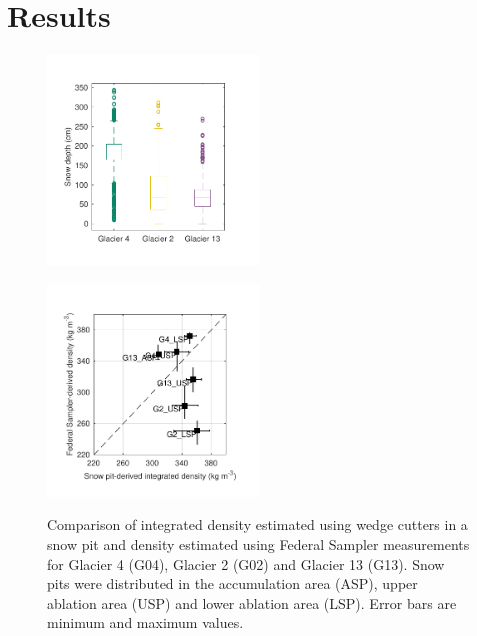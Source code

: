 \documentclass[twocolumn,letterpaper]{igs}
\begin{document}
\pagebreak
\section{Results}

\begin{figure}
	\centering
	\includegraphics[width =0.5\textwidth]{DepthBoxplot.pdf}\\
	\caption{}
	\label{fig:DepthBoxplot}
\end{figure}

\begin{figure}
	\centering
	\includegraphics[width =0.5\textwidth]{SPvsFS.pdf}\\
	\caption{Comparison of integrated density estimated using wedge cutters in a snow pit and density estimated using Federal Sampler measurements for Glacier 4 (G04), Glacier 2 (G02) and Glacier 13 (G13). Snow pits were distributed in the accumulation area (ASP), upper ablation area (USP) and lower ablation area (LSP). Error bars are minimum and maximum values.}
	\label{fig:density_pitVStube}
\end{figure}
\end{document}
